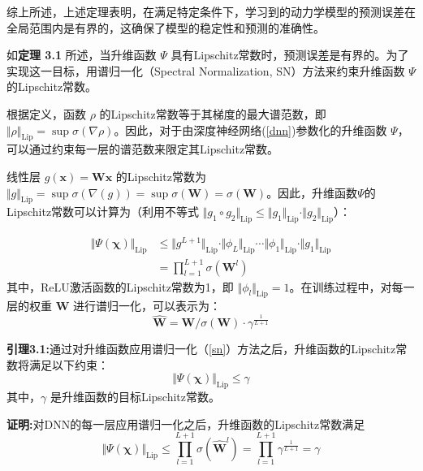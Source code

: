 \documentclass[lang=chs, degree=master, blindreview=true, winfonts=true]{yanputhesis}
\begin{document}
综上所述，上述定理表明，在满足特定条件下，学习到的动力学模型的预测误差在全局范围内是有界的，这确保了模型的稳定性和预测的准确性。


如\textbf{定理 3.1} 所述，当升维函数 $\Psi$ 具有Lipschitz常数时，预测误差是有界的。为了实现这一目标，用谱归一化（Spectral Normalization, SN）方法来约束升维函数 ${\Psi}$ 的Lipschitz常数。

根据定义，函数 $\rho$ 的Lipschitz常数等于其梯度的最大谱范数，即 $\Vert \rho \Vert_{\text{Lip}} = \sup \sigma (\nabla \rho)$。因此，对于由深度神经网络(\ref{dnn})参数化的升维函数 ${\Psi}$，可以通过约束每一层的谱范数来限定其Lipschitz常数。

线性层 $g(\bm{x})=\bm{W}\bm{x}$ 的Lipschitz常数为 $\Vert g \Vert_{\text{Lip}} = \sup \sigma(\nabla(g))=\sup \sigma(\bm{W})=\sigma(\bm{W})$。因此，升维函数${\Psi}$的Lipschitz常数可以计算为（利用不等式 $\Vert g_1 \circ g_2 \Vert_{\text{Lip}} \le \Vert g_1 \Vert_{\text{Lip}}\cdot \Vert g_2 \Vert_{\text{Lip}}$）：

\begin{equation}
    \begin{aligned}
	\Vert {\Psi}(\bm{\chi}) \Vert_{\text{Lip}} &\le \Vert g^{L+1} \Vert_{\text{Lip}} \cdot \Vert \phi_L \Vert_{\text{Lip}} \cdots \Vert \phi_1 \Vert_{\text{Lip}} \cdot \Vert g_1 \Vert_{\text{Lip}} \\
	&= \prod_{l=1}^{L+1}\sigma(\bm{W}^l)
\end{aligned}
\end{equation}
其中，ReLU激活函数的Lipschitz常数为1，即 $\Vert \phi_l \Vert_{\text{Lip}} = 1$。在训练过程中，对每一层的权重 $\bm{W}$ 进行谱归一化，可以表示为：
\begin{equation}
    \hat{\bm{W}} = \bm{W} / \sigma(\bm{W}) \cdot \gamma ^{\frac{1}{L+1}}  
	\label{sn}
\end{equation}

\textbf{引理3.1:}通过对升维函数应用谱归一化（\ref{sn}）方法之后，升维函数的Lipschitz常数将满足以下约束：
\begin{equation}
	\Vert {\Psi}(\bm{\chi}) \Vert_{\text{Lip}}\le \gamma
\end{equation}
	其中，$\gamma$ 是升维函数的目标Lipschitz常数。

\textbf{证明:}对DNN的每一层应用谱归一化之后，升维函数的Lipschitz常数满足
\begin{equation}
	\Vert {\Psi}(\bm{\chi}) \Vert_{\text{Lip}} \le \prod_{l=1}^{L+1}\sigma(\hat{\bm{W}}^l) = \prod_{l=1}^{L+1}\gamma^{\frac{1}{L+1}}=\gamma
\end{equation}
\end{document}
